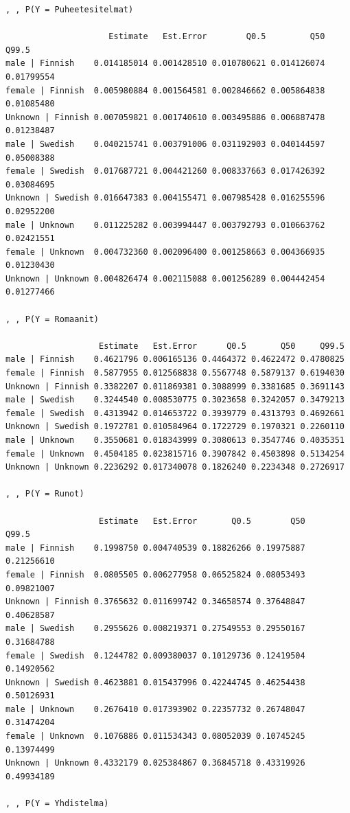 \documentclass[
  letterpaper,
  DIV=11,
  numbers=noendperiod]{scrartcl}
\begin{document}
\begin{verbatim}
, , P(Y = Puheetesitelmat)

                     Estimate   Est.Error        Q0.5         Q50      Q99.5
male | Finnish    0.014185014 0.001428510 0.010780621 0.014126074 0.01799554
female | Finnish  0.005980884 0.001564581 0.002846662 0.005864838 0.01085480
Unknown | Finnish 0.007059821 0.001740610 0.003495886 0.006887478 0.01238487
male | Swedish    0.040215741 0.003791006 0.031192903 0.040144597 0.05008388
female | Swedish  0.017687721 0.004421260 0.008337663 0.017426392 0.03084695
Unknown | Swedish 0.016647383 0.004155471 0.007985428 0.016255596 0.02952200
male | Unknown    0.011225282 0.003994447 0.003792793 0.010663762 0.02421551
female | Unknown  0.004732360 0.002096400 0.001258663 0.004366935 0.01230430
Unknown | Unknown 0.004826474 0.002115088 0.001256289 0.004442454 0.01277466

, , P(Y = Romaanit)

                   Estimate   Est.Error      Q0.5       Q50     Q99.5
male | Finnish    0.4621796 0.006165136 0.4464372 0.4622472 0.4780825
female | Finnish  0.5877955 0.012568838 0.5567748 0.5879137 0.6194030
Unknown | Finnish 0.3382207 0.011869381 0.3088999 0.3381685 0.3691143
male | Swedish    0.3244540 0.008530775 0.3023658 0.3242057 0.3479213
female | Swedish  0.4313942 0.014653722 0.3939779 0.4313793 0.4692661
Unknown | Swedish 0.1972781 0.010584964 0.1722729 0.1970321 0.2260110
male | Unknown    0.3550681 0.018343999 0.3080613 0.3547746 0.4035351
female | Unknown  0.4504185 0.023815716 0.3907842 0.4503898 0.5134254
Unknown | Unknown 0.2236292 0.017340078 0.1826240 0.2234348 0.2726917

, , P(Y = Runot)

                   Estimate   Est.Error       Q0.5        Q50      Q99.5
male | Finnish    0.1998750 0.004740539 0.18826266 0.19975887 0.21256610
female | Finnish  0.0805505 0.006277958 0.06525824 0.08053493 0.09821007
Unknown | Finnish 0.3765632 0.011699742 0.34658574 0.37648847 0.40628587
male | Swedish    0.2955626 0.008219371 0.27549553 0.29550167 0.31684788
female | Swedish  0.1244782 0.009380037 0.10129736 0.12419504 0.14920562
Unknown | Swedish 0.4623881 0.015437996 0.42244745 0.46254438 0.50126931
male | Unknown    0.2676410 0.017393902 0.22357732 0.26748047 0.31474204
female | Unknown  0.1076886 0.011534343 0.08052039 0.10745245 0.13974499
Unknown | Unknown 0.4332179 0.025384867 0.36845718 0.43319926 0.49934189

, , P(Y = Yhdistelma)


\end{verbatim}
\end{document}
